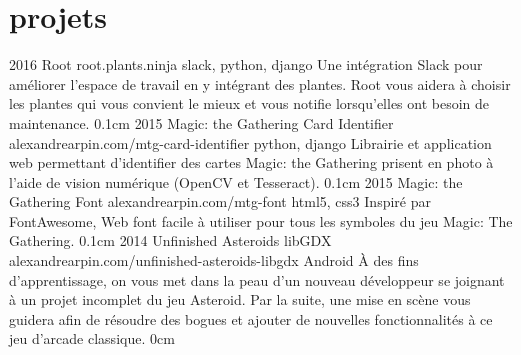 \documentclass[]{friggeri-cv}
\begin{document}
\section{projets}

\begin{entrylist}
 \entry
    {2016}
    {Root {\normalfont root.plants.ninja}}
    {slack, python, django}
    {Une intégration Slack pour améliorer l'espace de travail en y intégrant des plantes. Root vous aidera à choisir les plantes qui vous convient le mieux et vous notifie lorsqu'elles ont besoin de maintenance.}
    {0.1cm}
 \entry
    {2015}
    {Magic: the Gathering Card Identifier {\normalfont alexandrearpin.com/mtg-card-identifier}}
    {python, django}
    {Librairie et application web permettant d'identifier des cartes Magic: the Gathering prisent en photo à l'aide de vision numérique (OpenCV et Tesseract).}
    {0.1cm}
  \entry
    {2015}
    {Magic: the Gathering Font {\normalfont alexandrearpin.com/mtg-font}}
    {html5, css3}
    {Inspiré par FontAwesome, Web font facile à utiliser pour tous les symboles du jeu Magic: The Gathering.}
    {0.1cm}
  \entry
    {2014}
    {Unfinished Asteroids libGDX {\normalfont alexandrearpin.com/unfinished-asteroids-libgdx}}
    {Android}
    {À des fins d’apprentissage, on vous met dans la peau d'un nouveau développeur se joignant à un projet incomplet du jeu Asteroid. Par la suite, une mise en scène vous guidera afin de résoudre des bogues et ajouter de nouvelles fonctionnalités à ce jeu d’arcade classique.}
    {0cm}
\end{entrylist}
\end{document}

